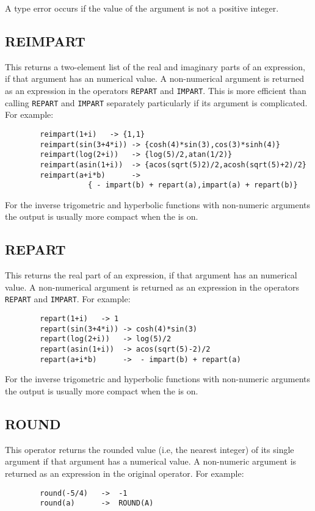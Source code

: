 A type error occurs if the value of the argument is not a positive integer.

\subsection{REIMPART}
\hypertarget{operator:REIMPART}{}
This returns a two-element list of the real and imaginary parts of an
expression, if that argument has an
numerical value.  A non-numerical argument is returned as an expression in
the operators \texttt{REPART} and \texttt{IMPART}.
This is more efficient than calling \texttt{REPART} and \texttt{IMPART}
separately particularly if its argument is complicated.
For example:
\begin{verbatim}
        reimpart(1+i)   -> {1,1}
        reimpart(sin(3+4*i)) -> {cosh(4)*sin(3),cos(3)*sinh(4)}
        reimpart(log(2+i))   -> {log(5)/2,atan(1/2)}
        reimpart(asin(1+i))  -> {acos(sqrt(5)2)/2,acosh(sqrt(5)+2)/2}
        reimpart(a+i*b)      ->
                   { - impart(b) + repart(a),impart(a) + repart(b)}
\end{verbatim}

For the inverse trigometric and hyperbolic functions with non-numeric arguments the output is usually more compact when the  is on.

\subsection{REPART}
\hypertarget{operator:REPART}{}
This returns the real part of an expression, if that argument has an
numerical value.  A non-numerical argument is returned as an expression in
the operators \texttt{REPART} and \texttt{IMPART}.
For example:
\begin{verbatim}
        repart(1+i)   -> 1
        repart(sin(3+4*i)) -> cosh(4)*sin(3)
        repart(log(2+i))   -> log(5)/2
        repart(asin(1+i))  -> acos(sqrt(5)-2)/2
        repart(a+i*b)      ->  - impart(b) + repart(a)
\end{verbatim}

For the inverse trigometric and hyperbolic functions with non-numeric arguments the output is usually more compact when the  is on.

\subsection{ROUND}
\hypertarget{operator:ROUND}{}
This operator returns the rounded value (i.e, the nearest integer) of its
single argument if that argument has a numerical value.  A non-numeric
argument is returned as an expression in the original operator.  For
example:
\begin{verbatim}
        round(-5/4)   ->  -1
        round(a)      ->  ROUND(A)
\end{verbatim}

